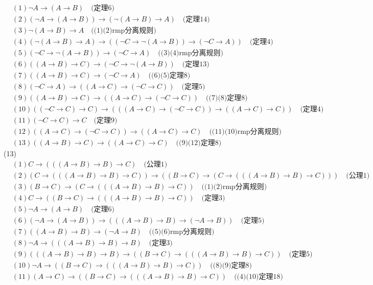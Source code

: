 \documentclass{article}
\begin{document}
\[
\begin{aligned}
&(1)\neg A \to (A \to B) \quad \mbox{(定理6)}\\
&(2)(\neg A \to (A \to B)) \to (\neg (A \to B) \to A) \quad \mbox{(定理14)} \\
&(3)\neg (A \to B) \to A \quad \mbox{((1)(2)rmp分离规则)}\\
&(4)(\neg (A \to B) \to A) \to ((\neg C \to \neg (A \to B)) \to (\neg C \to A)) \quad \mbox{(定理4)}\\
&(5)(\neg C \to \neg (A \to B)) \to (\neg C \to A) \quad \mbox{((3)(4)rmp分离规则)} \\
&(6)((A \to B) \to C) \to (\neg C \to \neg (A \to B)) \quad \mbox{(定理13)} \\
&(7)((A \to B) \to C) \to (\neg C \to A) \quad \mbox{((6)(5)定理8)} \\
&(8)(\neg C \to A) \to ((A \to C) \to (\neg C \to C)) \quad \mbox{(定理5)} \\
&(9)((A \to B) \to C) \to ((A \to C) \to (\neg C \to C)) \quad \mbox{((7)(8)定理8)} \\
&(10)((\neg C \to C) \to C) \to (((A \to C) \to (\neg C \to C)) \to ((A \to C) \to C)) \quad \mbox{(定理4)} \\
&(11)(\neg C \to C) \to C \quad \mbox{(定理9)} \\
&(12)((A \to C) \to (\neg C \to C)) \to ((A \to C) \to C) \quad \mbox{((11)(10)rmp分离规则)}\\
&(13)((A \to B) \to C) \to ((A \to C) \to C) \quad \mbox{((9)(12)定理8)}
\end{aligned}
\]
(13)
\[
\begin{aligned}
&(1)C \to (((A \to B) \to B) \to C) \quad \mbox{(公理1)}\\
&(2)(C \to (((A \to B) \to B) \to C)) \to ((B \to C) \to (C \to (((A \to B) \to B) \to C)))\quad \mbox{(公理1)} \\
&(3)(B \to C) \to (C \to (((A \to B) \to B) \to C)) \quad \mbox{((1)(2)rmp分离规则)}\\
&(4)C \to ((B \to C) \to (((A \to B) \to B) \to C)) \quad \mbox{(定理3)}\\
&(5)\neg A \to (A \to B) \quad \mbox{(定理6)} \\
&(6)(\neg A \to (A \to B)) \to (((A \to B) \to B) \to (\neg A \to B))\quad \mbox{(定理5)} \\
&(7)((A \to B) \to B) \to (\neg A \to B) \quad \mbox{((5)(6)rmp分离规则)} \\
&(8)\neg A \to (((A \to B) \to B) \to B) \quad \mbox{(定理3)} \\
&(9)(((A \to B) \to B) \to B) \to ((B \to C) \to (((A \to B) \to B) \to C)) \quad \mbox{(定理5)} \\
&(10)\neg A \to ((B \to C) \to (((A \to B) \to B) \to C)) \quad \mbox{((8)(9)定理8)} \\
&(11)(A \to C) \to ((B \to C) \to (((A \to B) \to B) \to C)) \quad \mbox{((4)(10)定理18)} \\
\end{aligned}
\]
\end{document}
